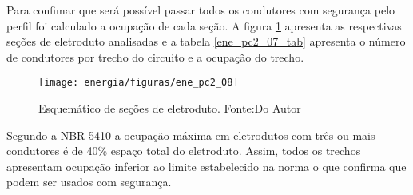 Para confimar que será possível passar todos os condutores com segurança pelo perfil foi calculado a ocupação de cada seção. A figura \ref{ene_pc2_08} apresenta as respectivas seções de eletroduto analisadas e a  tabela \ref{ene_pc2_07_tab} apresenta o número de condutores por trecho do circuito e a ocupação do trecho. 

\begin{figure}[H]
		\centering
		\texttt{[image: energia/figuras/ene\_pc2\_08]}
		\caption{Esquemático de seções de eletroduto. Fonte:Do Autor}
		\label{ene_pc2_08}
\end{figure}

\begin{table}[]
\caption{Taxa de ocupação das seções do perfil}
\label{ene_pc2_07_tab}
\end{table}

Segundo a NBR 5410 a ocupação máxima em eletrodutos com três ou mais condutores é de 40\% espaço total do eletroduto. Assim, todos os trechos apresentam ocupação inferior ao limite estabelecido na norma o que confirma que podem ser usados com segurança. 


